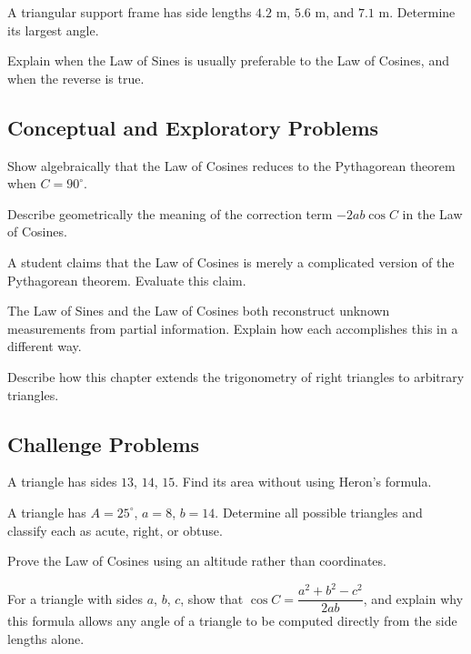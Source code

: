 \begin{exercise}
A triangular support frame has side lengths $4.2$ m, $5.6$ m, and $7.1$
m. Determine its largest angle.
\end{exercise}

\begin{exercise}
Explain when the Law of Sines is usually preferable to the Law of
Cosines, and when the reverse is true.
\end{exercise}

\subsection*{Conceptual and Exploratory Problems}
\begin{exercise}
Show algebraically that the Law of Cosines reduces to the Pythagorean
theorem when $C = 90^\circ$.
\end{exercise}

\begin{exercise}
Describe geometrically the meaning of the correction term $-2ab\cos C$ in
the Law of Cosines.
\end{exercise}

\begin{exercise}
A student claims that the Law of Cosines is merely a complicated version
of the Pythagorean theorem. Evaluate this claim.
\end{exercise}

\begin{exercise}
The Law of Sines and the Law of Cosines both reconstruct unknown
measurements from partial information. Explain how each accomplishes this
in a different way.
\end{exercise}

\begin{exercise}
Describe how this chapter extends the trigonometry of right triangles to
arbitrary triangles.
\end{exercise}

\subsection*{Challenge Problems}
\begin{exercise}
A triangle has sides $13$, $14$, $15$. Find its area without using
Heron's formula.
\end{exercise}

\begin{exercise}
A triangle has $A = 25^\circ$, $a = 8$, $b = 14$. Determine all possible
triangles and classify each as acute, right, or obtuse.
\end{exercise}

\begin{exercise}
Prove the Law of Cosines using an altitude rather than coordinates.
\end{exercise}

\begin{exercise}
For a triangle with sides $a$, $b$, $c$, show that
$\cos C = \dfrac{a^2+b^2-c^2}{2ab}$, and explain why this formula allows
any angle of a triangle to be computed directly from the side lengths
alone.
\end{exercise}
